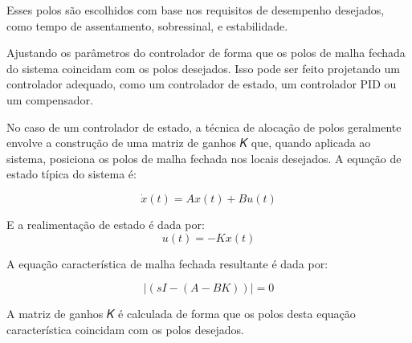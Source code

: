 Esses polos são escolhidos com base nos requisitos de desempenho desejados, como tempo de assentamento, sobressinal, e estabilidade.

Ajustando os parâmetros do controlador de forma que os polos de malha fechada do sistema coincidam com os polos desejados. Isso pode ser feito projetando um controlador adequado, como um controlador de estado, um controlador PID ou um compensador.

No caso de um controlador de estado, a técnica de alocação de polos geralmente envolve a construção de uma matriz de ganhos 𝐾 que, quando aplicada ao sistema, posiciona os polos de malha fechada nos locais desejados.
A equação de estado típica do sistema é:

\begin{equation}
	\dot{x}(t)=Ax(t)+Bu(t)
\end{equation}

E a realimentação de estado é dada por:
\begin{equation}
	u(t)=-Kx(t)
\end{equation}

 A equação característica de malha fechada resultante é dada por:
 
 \begin{equation}
 	|(sI-(A-BK))|=0
 \end{equation}
	
A matriz de ganhos 𝐾 é calculada de forma que os polos desta equação característica coincidam com os polos desejados.